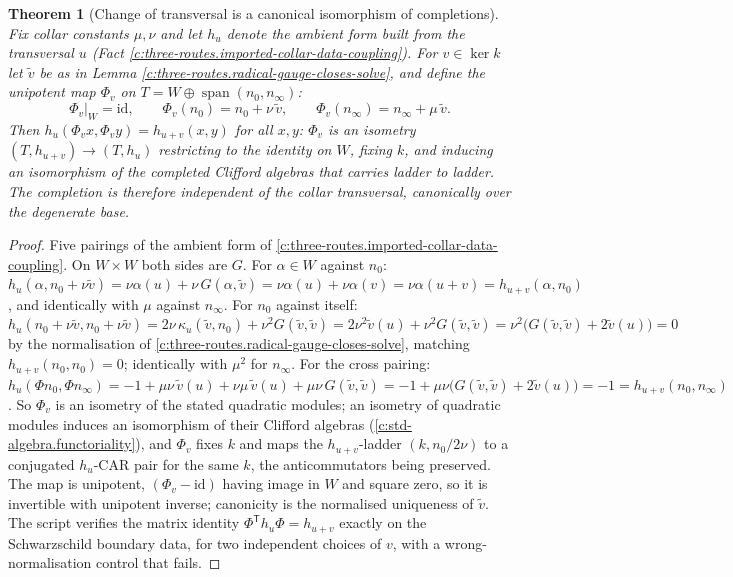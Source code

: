 \documentclass[11pt]{article}
\newtheorem{theorem}{Theorem}[section]
\theoremstyle{definition}
\theoremstyle{plain}
\providecommand{\id}{}\renewcommand{\id}{\mathrm{id}}
\providecommand{\nInf}{}\renewcommand{\nInf}{n_\infty}
\providecommand{\nO}{}\renewcommand{\nO}{n_0}
\begin{document}
\begin{theorem}[Change of transversal is a canonical isomorphism of completions]\label{c:three-routes.change-transversal-canonical-isomorphism-completions}
Fix collar constants $\mu, \nu$ and let $h_u$ denote the ambient form built from the transversal $u$ (Fact \ref{c:three-routes.imported-collar-data-coupling}). For $v \in \ker k$ let $\tilde v$ be as in Lemma \ref{c:three-routes.radical-gauge-closes-solve}, and define the unipotent map $\Phi_v$ on $T = W \oplus \operatorname{span}(\nO, \nInf)$:
\[
\Phi_v\big|_W = \id, \qquad \Phi_v(\nO) = \nO + \nu\,\tilde v, \qquad \Phi_v(\nInf) = \nInf + \mu\,\tilde v .
\]
Then $h_u(\Phi_v x, \Phi_v y) = h_{u+v}(x, y)$ for all $x, y$: $\Phi_v$ is an isometry $(T, h_{u+v}) \to (T, h_u)$ restricting to the identity on $W$, fixing $k$, and inducing an isomorphism of the completed Clifford algebras that carries ladder to ladder. The completion is therefore independent of the collar transversal, canonically over the degenerate base.
\end{theorem}
\begin{proof}
Five pairings of the ambient form of \ref{c:three-routes.imported-collar-data-coupling}. On $W \times W$ both sides are $G$. For $\alpha \in W$ against $\nO$: $h_u(\alpha, \nO + \nu\tilde v) = \nu\alpha(u) + \nu\,G(\alpha, \tilde v) = \nu\alpha(u) + \nu\alpha(v) = \nu\alpha(u + v) = h_{u+v}(\alpha, \nO)$, and identically with $\mu$ against $\nInf$. For $\nO$ against itself: $h_u(\nO + \nu\tilde v, \nO + \nu\tilde v) = 2\nu\,\kappa_u(\tilde v, \nO) + \nu^2 G(\tilde v, \tilde v) = 2\nu^2\tilde v(u) + \nu^2 G(\tilde v, \tilde v) = \nu^2\bigl(G(\tilde v,\tilde v) + 2\tilde v(u)\bigr) = 0$ by the normalisation of \ref{c:three-routes.radical-gauge-closes-solve}, matching $h_{u+v}(\nO, \nO) = 0$; identically with $\mu^2$ for $\nInf$. For the cross pairing: $h_u(\Phi\nO, \Phi\nInf) = -1 + \mu\nu\,\tilde v(u) + \nu\mu\,\tilde v(u) + \mu\nu\,G(\tilde v, \tilde v) = -1 + \mu\nu\bigl(G(\tilde v, \tilde v) + 2\tilde v(u)\bigr) = -1 = h_{u+v}(\nO, \nInf)$. So $\Phi_v$ is an isometry of the stated quadratic modules; an isometry of quadratic modules induces an isomorphism of their Clifford algebras (\ref{c:std-algebra.functoriality}), and $\Phi_v$ fixes $k$ and maps the $h_{u+v}$-ladder $(k, \nO/2\nu)$ to a conjugated $h_u$-CAR pair for the same $k$, the anticommutators being preserved. The map is unipotent, $(\Phi_v - \id)$ having image in $W$ and square zero, so it is invertible with unipotent inverse; canonicity is the normalised uniqueness of $\tilde v$. The script verifies the matrix identity $\Phi^{\mathsf{T}} h_u \Phi = h_{u+v}$ exactly on the Schwarzschild boundary data, for two independent choices of $v$, with a wrong-normalisation control that fails.

\end{proof}
\end{document}
